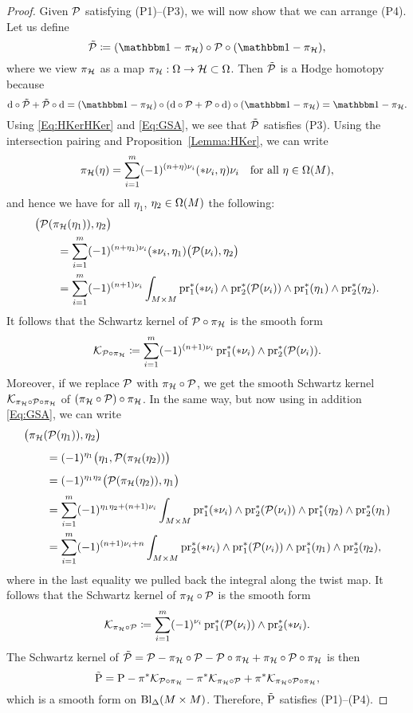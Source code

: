 \documentclass[\MainFolder/Text.tex]{subfiles}
\begin{document}
\begin{proof}
Given $\mathcal{P}$ satisfying (P1)--(P3), we will now show that we can arrange (P4). Let us define
\[ \tilde{\Htp}\coloneqq (\Id - \pi_{\Harm}) \circ \Htp \circ (\Id - \pi_{\Harm}), \]
where we view $\pi_{\mathcal{H}}$ as a map $\pi_{\mathcal{H}}: \Omega \rightarrow \mathcal{H} \subset \Omega$. Then $\tilde{\mathcal{P}}$ is a Hodge homotopy because
\[ \Dd\circ\tilde{\Htp} + \tilde{\Htp} \circ \Dd = (\Id-\pi_{\Harm})\circ (\Dd\circ \Htp + \Htp \circ \Dd) \circ (\Id-\pi_{\Harm}) = \Id-\pi_{\Harm}. \]
Using \eqref{Eq:HKerHKer} and \eqref{Eq:GSA}, we see that $\tilde{\mathcal{P}}$ satisfies (P3). Using the intersection pairing and Proposition~\ref{Lemma:HKer}, we can write 
\[ \pi_{\mathcal{H}}(\eta) = \sum_{i=1}^m (-1)^{(n+\eta)\nu_i} (* \nu_i, \eta) \nu_i \quad\text{for all }\eta\in\Omega(M),\]
and hence we have for all $\eta_1$, $\eta_2\in \Omega(M)$ the following:
\begin{align*}
&\bigl(\mathcal{P}(\pi_{\mathcal{H}}(\eta_1)),\eta_2\bigr) \\
&\qquad = \sum_{i=1}^m (-1)^{(n+\eta_1)\nu_i} (* \nu_i, \eta_1) \bigl(\mathcal{P}(\nu_i), \eta_2\bigr) \\ 
& \qquad = \sum_{i=1}^m (-1)^{(n+1)\nu_i}  \int_{M\times M}\operatorname{\mathrm{pr}}_1^*(* \nu_i)\wedge \operatorname{\mathrm{pr}}_2^*(\mathcal{P}(\nu_i))\wedge \operatorname{\mathrm{pr}}_1^*(\eta_1)\wedge \operatorname{\mathrm{pr}}_2^*(\eta_2).
\end{align*}
It follows that the Schwartz kernel of $\mathcal{P} \circ \pi_{\mathcal{H}}$ is the smooth form
\[ \mathcal{K}_{\mathcal{P}\circ \pi_{\mathcal{H}}} \coloneqq \sum_{i=1}^m (-1)^{(n+1)\nu_i}\operatorname{\mathrm{pr}}_1^*(* \nu_i)\wedge \operatorname{\mathrm{pr}}_2^*(\mathcal{P}(\nu_i)). \]
Moreover, if we replace $\mathcal{P}$ with 
$\pi_{\mathcal{H}}\circ \mathcal{P}$, we get the smooth Schwartz kernel $\mathcal{K}_{\pi_{\mathcal{H}}\circ\mathcal{P}\circ \pi_{\mathcal{H}}}$ of $(\pi_{\mathcal{H}}\circ \mathcal{P}) \circ \pi_{\mathcal{H}}$. In the same way, but now using in addition \eqref{Eq:GSA}, we can write
\begin{align*}
&\bigl(\pi_{\mathcal{H}}(\mathcal{P}(\eta_1)),\eta_2 \bigr) \\[1ex]
& \qquad = (-1)^{\eta_1}\bigl( \eta_1, \mathcal{P}(\pi_{\mathcal{H}}(\eta_2))\bigr) \\[1ex]
& \qquad = (-1)^{\eta_1 \eta_2} \bigl(\mathcal{P}(\pi_{\mathcal{H}}(\eta_2)),\eta_1\bigr) \\[.5ex]
 &\qquad = \sum_{i=1}^m (-1)^{\eta_1 \eta_2 + (n+1)\nu_i} \int_{M\times M}\operatorname{\mathrm{pr}}_1^*(* \nu_i)\wedge \operatorname{\mathrm{pr}}_2^*(\mathcal{P}(\nu_i))\wedge \operatorname{\mathrm{pr}}_1^*(\eta_2)\wedge \operatorname{\mathrm{pr}}_2^*(\eta_1) \\
 &\qquad = \sum_{i=1}^m (-1)^{(n+1) \nu_i + n} \int_{M \times M} \operatorname{\mathrm{pr}}_2^*(* \nu_i) \wedge \operatorname{\mathrm{pr}}_1^*(\mathcal{P}(\nu_i))\wedge \operatorname{\mathrm{pr}}_1^*(\eta_1)\wedge\operatorname{\mathrm{pr}}_2^*(\eta_2),
\end{align*}
where in the last equality we pulled back the integral along the twist map. It follows that the Schwartz kernel of $\pi_{\mathcal{H}}\circ \mathcal{P}$ is the smooth form
\[ \mathcal{K}_{\pi_{\mathcal{H}}\circ\mathcal{P}} \coloneqq \sum_{i=1}^m (-1)^{\nu_i}\operatorname{\mathrm{pr}}_1^*(\mathcal{P}(\nu_i))\wedge \operatorname{\mathrm{pr}}_2^*(* \nu_i). \]
The Schwartz kernel of $\tilde{\mathcal{P}} = \mathcal{P} - \pi_{\mathcal{H}}\circ \mathcal{P} - \mathcal{P} \circ \pi_{\mathcal{H}} + \pi_{\mathcal{H}}\circ\mathcal{P}\circ\pi_{\mathcal{H}}$ is then
\[ \tilde{\mathrm{P}} = \mathrm{P} - \pi^* \mathcal{K}_{\mathcal{P} \circ \pi_{\mathcal{H}}} - \pi^* \mathcal{K}_{\pi_{\mathcal{H}}\circ\mathcal{P}} + \pi^* \mathcal{K}_{\pi_{\mathcal{H}}\circ\mathcal{P}\circ\pi_{\mathcal{H}}}, \]
which is a smooth form on $\mathrm{Bl}_{\Delta}(M\times M)$. Therefore, $\tilde{\mathrm{P}}$ satisfies (P1)--(P4).


\end{proof}
\end{document}
